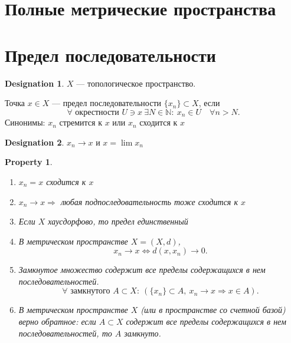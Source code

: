 \documentclass[11pt]{book}
\newcommand{\N}{\mathbb{N}}
\theoremstyle{definition}
\theoremstyle{plain}
\theoremstyle{plain}
\newtheorem*{prop}{Property}
\theoremstyle{definition}
\newtheorem*{name}{Designation}
\theoremstyle{remark}
\begin{document}
\section{Полные метрические пространства}
\section{Предел последовательности}
\begin{name}
    $ X$ ---  топологическое пространство.
\end{name}
\begin{defn}
    Точка $ x \in  X$ --- предел последовательности $ \{x_n\} \subset X$, если$$ \forall \text{ окрестности } U \ni x ~ \exists N \in \N: ~ x_n \in  U \quad \forall n > N.$$
    Синонимы:
        $ x_n$ стремится к  $ x$ или  $ x_{n}$ сходится к $ x$ 
    \begin{name}
	$ x_{n} \to  x$ и $ x = \lim x_{n} $
    \end{name}
\end{defn}
\begin{prop}
    $ $
    \begin{enumerate}
        \item $ x_{n} = x$ сходится к $ x$
        \item $ x_{n} \to  x \Longrightarrow $ любая подпоследовательность тоже сходится к $ x$
	\item Если  $ X$ хаусдорфово, то предел единственный
	\item  В метрическом пространстве $ X = (X, d)$,
	     \[
		 x_{n} \to  x \Longleftrightarrow d(x, x_n) \to  0
	    .\] 
	\item Замкнутое множество содержит все пределы содержащихся в нем последовательностей.
	    \[
		\forall  \text{ замкнутого } A \subset X: ~ (\{x_{n}\} \subset A, ~ x_{n} \to  x \Longrightarrow x \in  A)
	    .\] 
	\item В метрическом пространстве $ X$ (или в пространстве со счетной базой) верно обратное:
	    если $ A \subset X$ содержит все пределы содержащихся в нем последовательностей, то $ A$ замкнуто.
    \end{enumerate}
\end{prop}
\end{document}
